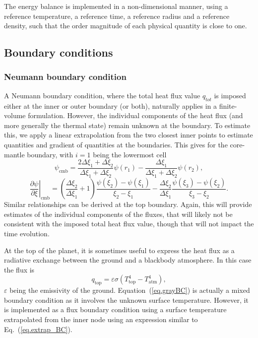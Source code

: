 \documentclass{article}
\begin{document}
The energy balance is implemented in a non-dimensional manner, using a reference temperature, a reference time, a reference radius and a reference density, such that the order magnitude of each physical quantity is close to one.

\subsection{Boundary conditions}

\subsubsection{Neumann boundary condition}

A Neumann boundary condition, where the total heat flux value $q_{tot}$ is imposed either at the inner or outer boundary (or both), naturally applies in a finite-volume formulation. However, the individual components of the heat flux (and more generally the thermal state) remain unknown at the boundary. To estimate this, we apply a linear extrapolation from the two closest inner points to estimate quantities and gradient of quantities at the boundaries. This gives for the core-mantle boundary, with $i=1$ being the lowermost cell
\begin{equation}
    \psi_\mathrm{cmb} = \frac{2\Delta\xi_1+\Delta\xi_2}{\Delta\xi_1+\Delta\xi_2}\psi(r_1) - \frac{\Delta\xi_1}{\Delta\xi_1+\Delta\xi_2}\psi(r_2),
    \label{eq.extrap_BC}
\end{equation}
\begin{equation}
        \left.\frac{\partial \psi}{\partial \xi}\right|_\mathrm{cmb}=\left(\frac{\Delta\xi_2}{\Delta\xi_1}+1\right)\frac{\psi(\xi_2)-\psi(\xi_1)}{\xi_2-\xi_1} - \frac{\Delta\xi_2}{\Delta\xi_1}\frac{\psi(\xi_3)-\psi(\xi_2)}{\xi_3-\xi_2}.
        \label{eq.extrap_grad_BC}
\end{equation}
Similar relationships can be derived at the top boundary. Again, this will provide estimates of the individual components of the fluxes, that will likely not be consistent with the imposed total heat flux value, though that will not impact the time evolution.

At the top of the planet, it is sometimes useful to express the heat flux as a radiative exchange between the ground and a blackbody atmosphere. In this case the flux is
\begin{equation}
    q_\mathrm{top} = \varepsilon \sigma (T_\mathrm{top}^4 - T_\mathrm{atm}^4),
\label{eq.grayBC}
\end{equation}
$\varepsilon$ being the emissivity of the ground. Equation~(\ref{eq.grayBC}) is actually a mixed boundary condition as it involves the unknown surface temperature. However, it is implemented as a flux boundary condition using a surface temperature extrapolated from the inner node using an expression similar to Eq.~(\ref{eq.extrap_BC}).
\end{document}
